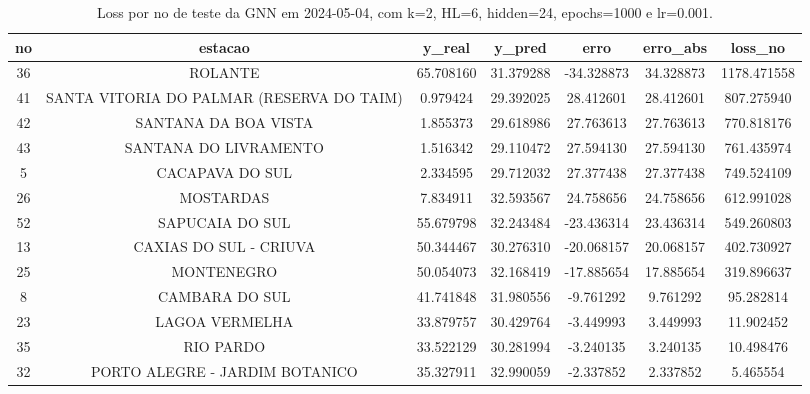 \begin{table}[h]
\centering
\caption{Loss por no de teste da GNN em 2024-05-04, com k=2, HL=6, hidden=24, epochs=1000 e lr=0.001.}
\label{tab:gnn_loss_k2_hl6_h24_e1000_d20240504}
\begin{tabular}{ccccccc}
\toprule
no & estacao & y\_real & y\_pred & erro & erro\_abs & loss\_no \\
\midrule
36 & ROLANTE & 65.708160 & 31.379288 & -34.328873 & 34.328873 & 1178.471558 \\
41 & SANTA VITORIA DO PALMAR (RESERVA DO TAIM) & 0.979424 & 29.392025 & 28.412601 & 28.412601 & 807.275940 \\
42 & SANTANA DA BOA VISTA & 1.855373 & 29.618986 & 27.763613 & 27.763613 & 770.818176 \\
43 & SANTANA DO LIVRAMENTO & 1.516342 & 29.110472 & 27.594130 & 27.594130 & 761.435974 \\
5 & CACAPAVA DO SUL & 2.334595 & 29.712032 & 27.377438 & 27.377438 & 749.524109 \\
26 & MOSTARDAS & 7.834911 & 32.593567 & 24.758656 & 24.758656 & 612.991028 \\
52 & SAPUCAIA DO SUL & 55.679798 & 32.243484 & -23.436314 & 23.436314 & 549.260803 \\
13 & CAXIAS DO SUL - CRIUVA & 50.344467 & 30.276310 & -20.068157 & 20.068157 & 402.730927 \\
25 & MONTENEGRO & 50.054073 & 32.168419 & -17.885654 & 17.885654 & 319.896637 \\
8 & CAMBARA DO SUL & 41.741848 & 31.980556 & -9.761292 & 9.761292 & 95.282814 \\
23 & LAGOA VERMELHA & 33.879757 & 30.429764 & -3.449993 & 3.449993 & 11.902452 \\
35 & RIO PARDO & 33.522129 & 30.281994 & -3.240135 & 3.240135 & 10.498476 \\
32 & PORTO ALEGRE - JARDIM BOTANICO & 35.327911 & 32.990059 & -2.337852 & 2.337852 & 5.465554 \\
\bottomrule
\end{tabular}
\end{table}
